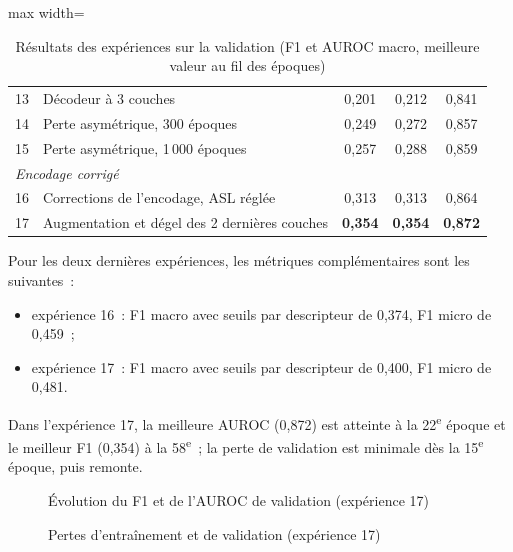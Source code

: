\begin{table}
\begin{adjustbox}{max width=\linewidth}
\begin{tabular}{|c|l||c|c|c|}
      13 & Décodeur à 3 couches & 0,201 & 0,212 & 0,841 \\
      14 & Perte asymétrique, 300 époques & 0,249 & 0,272 & 0,857 \\
      15 & Perte asymétrique, 1\,000 époques & 0,257 & 0,288 & 0,859 \\
      \hline
      \multicolumn{5}{|l|}{\emph{Encodage corrigé}} \\
      \hline
      16 & Corrections de l'encodage, ASL réglée & 0,313 & 0,313 & 0,864 \\
      17 & Augmentation et dégel des 2 dernières couches & \textbf{0,354} & \textbf{0,354} & \textbf{0,872} \\
      \hline
   \end{tabular}
   \end{adjustbox}
   \caption{Résultats des expériences sur la validation (F1 et AUROC macro, meilleure valeur au fil des époques)}
   \label{tab:Experiences}
\end{table}

Pour les deux dernières expériences, les métriques complémentaires sont les suivantes~:
\begin{itemize}
   \item expérience 16~: F1 macro avec seuils par descripteur de 0,374, F1 micro de 0,459~;
   \item expérience 17~: F1 macro avec seuils par descripteur de 0,400, F1 micro de 0,481.
\end{itemize}
Dans l'expérience 17, la meilleure AUROC (0,872) est atteinte à la 22\textsuperscript{e} époque et le meilleur F1 (0,354) à la 58\textsuperscript{e}~; la perte de validation est minimale dès la 15\textsuperscript{e} époque, puis remonte.

\begin{figure}
   \centering
   \caption{Évolution du F1 et de l'AUROC de validation (expérience 17)}
   \label{fig:CourbesF1}
\end{figure}

\begin{figure}
   \centering
   \caption{Pertes d'entraînement et de validation (expérience 17)}
   \label{fig:CourbesPerte}
\end{figure}

